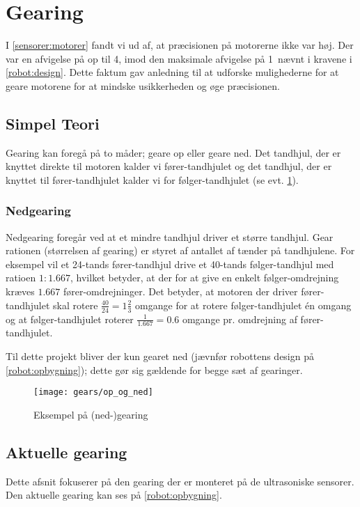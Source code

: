 \section{Gearing}\label{robot:gearing}
I \cref{sensorer:motorer} fandt vi ud af, at præcisionen på motorerne ikke var høj.
Der var en afvigelse på op til 4\dg, imod den maksimale afvigelse på 1\dg ~nævnt i kravene i \cref{robot:design}.
Dette faktum gav anledning til at udforske mulighederne for at geare motorene for at mindske usikkerheden og øge præcisionen.

\subsection{Simpel Teori}\label{gearing:simpel_teori}
Gearing kan foregå på to måder; geare op eller geare ned.
Det tandhjul, der er knyttet direkte til motoren kalder vi fører-tandhjulet og det tandhjul, der er knyttet til fører-tandhjulet kalder vi for følger-tandhjulet (se evt. \cref{gearing:nedgearing}).

\subsubsection{Nedgearing}
Nedgearing foregår ved at et mindre tandhjul driver et større tandhjul.
Gear rationen (størrelsen af gearing) er styret af antallet af tænder på tandhjulene.
For eksempel vil et 24-tands fører-tandhjul drive et 40-tands følger-tandhjul med ratioen $1:1.667$, hvilket betyder, at der for at give en enkelt følger-omdrejning kræves $1.667$ fører-omdrejninger. 
Det betyder, at motoren der driver fører-tandhjulet skal rotere $\frac{40}{24} = 1 \frac{2}{3}$ omgange for at rotere følger-tandhjulet én omgang og at følger-tandhjulet roterer $\frac{1}{1.667} = 0.6$ omgange pr. omdrejning af fører-tandhjulet.

Til dette projekt bliver der kun gearet ned (jævnfør robottens design på \cref{robot:opbygning}); dette gør sig gældende for begge sæt af gearinger.


\begin{figure}[h]
\centering
\texttt{[image: gears/op\_og\_ned]}
\caption{Eksempel på (ned-)gearing}
\label{gearing:nedgearing}
\end{figure}

\subsection{Aktuelle gearing}
Dette afsnit fokuserer på den gearing der er monteret på de ultrasoniske sensorer.
Den aktuelle gearing kan ses på \cref{robot:opbygning}.

